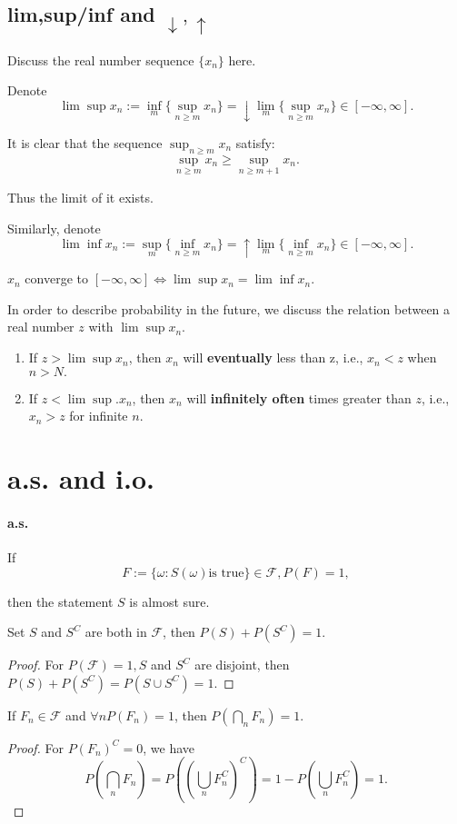 \subsection{lim,sup/inf and $\downarrow,\uparrow$}
Discuss the real number sequence $\{ x_n\}$ here.

Denote 
$$\lim\sup x_n := \inf_m\{ \sup_{n\geq m}x_n\} = \downarrow \lim_m\{\sup_{n\geq m}x_n\}\in [-\infty,\infty].$$

It is clear that the sequence $\sup_{n\geq m} x_n$  satisfy:
$$\sup_{n\geq m} x_n \geq \sup_{n\geq m+1} x_n.$$

Thus the limit of it exists.

Similarly, denote
$$\lim\inf x_n := \sup_m\{ \inf_{n\geq m}x_n\} = \uparrow \lim_m\{\inf_{n\geq m}x_n\}\in [-\infty,\infty].$$

\begin{theorem}
  $x_n$ converge to $[-\infty,\infty] \Leftrightarrow \lim\sup x_n = \lim\inf x_n.$ 
\end{theorem}

In order to describe probability in the future, we discuss the relation between a real number $z$ with $\lim\sup x_n$.

\begin{enumerate}
  \item If $z > \lim\sup x_n$, then $x_n$ will \textbf{eventually} less than z, i.e., $x_n < z$ when $n > N.$
  \item If $z < \lim\sup. x_n$, then $x_n$ will \textbf{infinitely often} times greater than $z$, i.e., $x_n > z$ for infinite $n$.
\end{enumerate}
\section{a.s.  and  i.o.}
\paragraph{a.s.} If 
$$F := \{\omega:S(\omega) \text{is true}\} \in \mathcal F, P(F) = 1,$$

then the statement $S$ is almost sure.

\begin{lemma}
  Set $S $ and $S^C$ are both in $\mathcal F$, then $P(S) + P(S^C) = 1$.
  \begin{proof}
    For $P(\mathcal F) = 1, S$ and $S^C$ are disjoint, then $P(S) + P(S^C) = P(S\cup S^C) = 1.$
  \end{proof}
\end{lemma}
\begin{theorem}
  If $F_n\in \mathcal F$ and $\forall n P(F_n) = 1$,  then $P(\bigcap_n F_n) = 1.$
  
  \begin{proof}
    For $P(F_n)^C = 0$, we have 
    $$P(\bigcap_n F_n) = P((\bigcup_n F_n^C)^C) = 1-P(\bigcup_n F_n^C) = 1.$$
  \end{proof}
\end{theorem}

